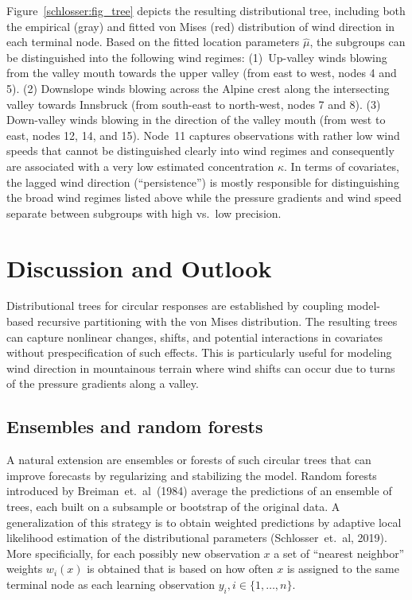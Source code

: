 \documentclass[twoside]{report}
\begin{document}
Figure~\ref{schlosser:fig_tree} depicts the resulting distributional tree, including
both the empirical (gray) and fitted von Mises (red) distribution of wind direction
in each terminal node. Based on the fitted location parameters $\hat \mu$, the subgroups
can be distinguished into the following wind regimes:
(1)~Up-valley winds blowing from the valley mouth towards the upper valley
(from east to west, nodes 4 and 5). (2) Downslope winds blowing across
the Alpine crest along the intersecting valley towards Innsbruck (from south-east to
north-west, nodes 7 and 8). (3) Down-valley winds blowing in the direction
of the valley mouth (from west to east, nodes 12, 14, and 15). Node~11
captures observations with rather low wind speeds that cannot be distinguished
clearly into wind regimes and consequently are associated with a very low
estimated concentration $\hat \kappa$. In terms of covariates, the lagged
wind direction (``persistence'') is mostly responsible for distinguishing
the broad wind regimes listed above while the pressure gradients and wind
speed separate between subgroups with high vs.\ low precision.

\section{Discussion and Outlook}

Distributional trees for circular responses are established by coupling
model-based recursive partitioning with the von Mises distribution.
The resulting trees can capture nonlinear changes, shifts, and potential interactions
in covariates without prespecification of such effects. This is particularly
useful for modeling wind direction in mountainous terrain where wind shifts
can occur due to turns of the pressure gradients along a valley.

\subsection{Ensembles and random forests}
A natural extension are ensembles or forests of such circular trees
that can improve forecasts by regularizing and stabilizing the model.
Random forests introduced by Breiman~et.~al~(1984) average the
predictions of an ensemble of trees, each built on a subsample 
or bootstrap of the original data. 
A generalization of this strategy is to obtain weighted predictions
by adaptive local likelihood estimation of the distributional parameters
(Schlosser~et.~al, 2019). More specificially, for each possibly new
observation $x$ a set of ``nearest neighbor'' weights $w_i(x)$ is obtained 
that is based on how often $x$ is assigned to the same terminal node as
each learning observation $y_i, i \in \{1,\ldots,n\}$.
\end{document}
